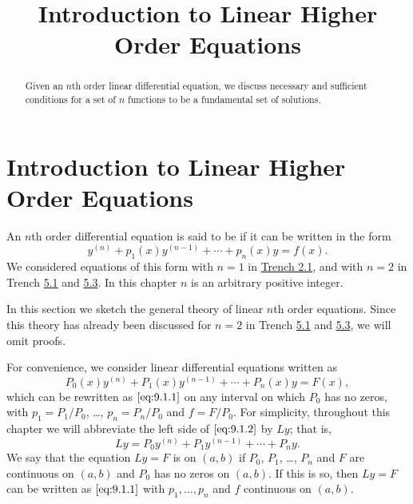 \documentclass{ximera}
\title{Introduction to Linear Higher Order Equations}%
\begin{document}
\begin{abstract}
Given an $n$th order linear differential equation, we discuss necessary and sufficient conditions for a set of $n$ functions to be a fundamental set of solutions.
\end{abstract}

\maketitle

\section*{Introduction to Linear Higher Order Equations}

An $n$th order differential equation is said to be  if it
can be written in the form
\begin{equation}\label{eq:9.1.1}
y^{(n)}+p_1(x)y^{(n-1)}+\cdots+p_n(x)y=f(x).
\end{equation}
We considered equations of this form with $n=1$ in
\href{https://ximera.osu.edu/ode/main/linearFirstOrderDiffEq/linearFirstOrderDiffEq}{Trench 2.1}, and with $n=2$ in
Trench \href{https://ximera.osu.edu/ode/main/homogeneousLinearEquations/homogeneousLinearEquations}{5.1} and \href{https://ximera.osu.edu/ode/main/nonHomogeneousLinear/nonHomogeneousLinear}{5.3}. In this chapter $n$ is an arbitrary
positive integer.

In this section we sketch the general theory of linear $n$th order equations. Since this theory has already been discussed for $n=2$ in Trench \href{https://ximera.osu.edu/ode/main/homogeneousLinearEquations/homogeneousLinearEquations}{5.1} and \href{https://ximera.osu.edu/ode/main/nonHomogeneousLinear/nonHomogeneousLinear}{5.3}, we will omit
proofs.

For convenience, we consider linear differential equations written
as
\begin{equation}\label{eq:9.1.2}
P_0(x)y^{(n)}+P_1(x)y^{(n-1)}+\cdots+P_n(x)y=F(x),
\end{equation}
which can be rewritten as $\eqref{eq:9.1.1}$ on any interval on which $P_0$ has no zeros, with $p_1=P_1/P_0$, \dots, $p_n=P_n/P_0$ and
$f=F/P_0$. For simplicity, throughout this chapter we will
abbreviate the left side of $\eqref{eq:9.1.2}$ by $Ly$; that is,
$$
Ly=P_0y^{(n)}+P_1y^{(n-1)}+\cdots+P_ny.
$$
We say that the equation $Ly=F$ is  on $(a,b)$ if
$P_0$, $P_1$, \dots, $P_n$ and $F$ are continuous on $(a,b)$ and $P_0$ has
no zeros on $(a,b)$. If this is so, then $Ly=F$ can be
written as $\eqref{eq:9.1.1}$ with $p_1, \dots, p_n$ and $f$ continuous on
$(a,b)$.
\end{document}
